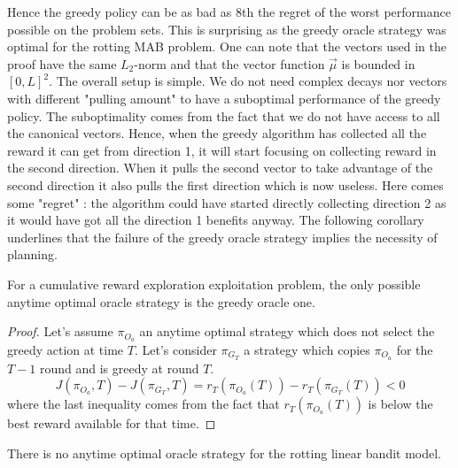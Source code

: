 Hence the greedy policy can be as bad as 8th the regret of the worst performance possible on the problem sets. This is surprising as the greedy oracle strategy was optimal for the rotting MAB problem.  One can note that the vectors used in the proof have the same $L_2$-norm and that the vector function $\vec{\mu}$ is bounded in $[0, L]^2$. The overall setup is simple. We do not need complex decays nor vectors with different "pulling amount" to have a suboptimal performance of the greedy policy. The suboptimality comes from the fact that we do not have access to all the canonical vectors. Hence, when the greedy algorithm has collected all the reward it can get from direction 1, it will start focusing on collecting reward in the second direction. When it pulls the second vector to take advantage of the second direction it also pulls the first direction which is now useless. Here comes some "regret" : the algorithm could have started directly collecting direction 2 as it would have got all the direction 1 benefits anyway. The following corollary underlines that the failure of the greedy oracle strategy implies the necessity of planning.

\begin{lemma}
For a cumulative reward exploration exploitation problem, the only possible anytime optimal oracle strategy is the greedy oracle one.
\end{lemma}
\begin{proof}
Let's assume $\pi_{O_a}$ an anytime optimal strategy which does not select the greedy action at time $T$.
Let's consider $\pi_{G_T}$ a strategy which copies $\pi_{O_a}$ for the $T-1$ round and is greedy at round $T$.
\[
J(\pi_{O_a}, T) - J(\pi_{G_T},T) = r_T(\pi_{O_a}(T)) - r_T(\pi_{G_T}(T)) < 0
\]
where the last inequality comes from the fact that $r_T(\pi_{O_a}(T))$ is below the best reward available for that time. 
\end{proof}

\begin{corollary}
There is no anytime optimal oracle strategy for the rotting linear bandit model. 
\end{corollary}


